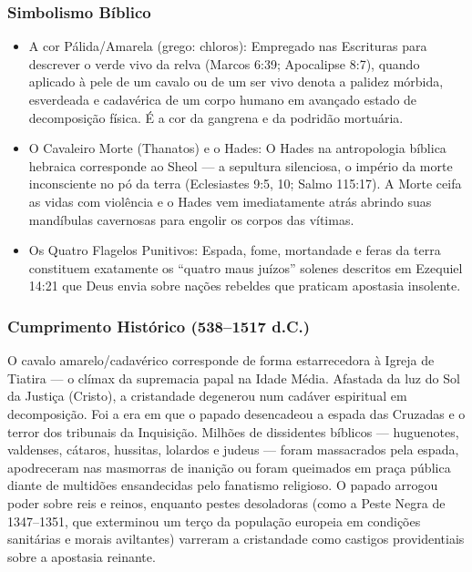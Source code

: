 \documentclass[11pt,a4paper,openany]{book}
\begin{document}
\subsubsection*{Simbolismo Bíblico}
\begin{itemize}
  \item A cor Pálida/Amarela (grego: chloros): Empregado nas Escrituras para descrever o verde vivo da relva (Marcos 6:39; Apocalipse 8:7), quando aplicado à pele de um cavalo ou de um ser vivo denota a palidez mórbida, esverdeada e cadavérica de um corpo humano em avançado estado de decomposição física. É a cor da gangrena e da podridão mortuária.
  \item O Cavaleiro Morte (Thanatos) e o Hades: O Hades na antropologia bíblica hebraica corresponde ao Sheol — a sepultura silenciosa, o império da morte inconsciente no pó da terra (Eclesiastes 9:5, 10; Salmo 115:17). A Morte ceifa as vidas com violência e o Hades vem imediatamente atrás abrindo suas mandíbulas cavernosas para engolir os corpos das vítimas.
  \item Os Quatro Flagelos Punitivos: Espada, fome, mortandade e feras da terra constituem exatamente os ``quatro maus juízos'' solenes descritos em Ezequiel 14:21 que Deus envia sobre nações rebeldes que praticam apostasia insolente.
\end{itemize}



\subsubsection*{Cumprimento Histórico (538–1517 d.C.)}
O cavalo amarelo/cadavérico corresponde de forma estarrecedora à Igreja de Tiatira — o clímax da supremacia papal na Idade Média. Afastada da luz do Sol da Justiça (Cristo), a cristandade degenerou num cadáver espiritual em decomposição. Foi a era em que o papado desencadeou a espada das Cruzadas e o terror dos tribunais da Inquisição. Milhões de dissidentes bíblicos — huguenotes, valdenses, cátaros, hussitas, lolardos e judeus — foram massacrados pela espada, apodreceram nas masmorras de inanição ou foram queimados em praça pública diante de multidões ensandecidas pelo fanatismo religioso. O papado arrogou poder sobre reis e reinos, enquanto pestes desoladoras (como a Peste Negra de 1347–1351, que exterminou um terço da população europeia em condições sanitárias e morais aviltantes) varreram a cristandade como castigos providentiais sobre a apostasia reinante.
\end{document}
